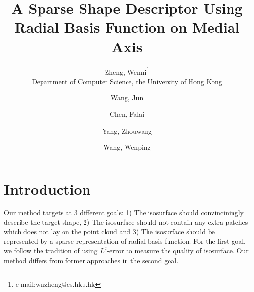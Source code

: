 \documentclass[review]{acmsiggraph}
\title{A Sparse Shape Descriptor Using Radial Basis Function on Medial Axis}
\author{Zheng, Wenni\thanks{e-mail:wnzheng@cs.hku.hk}\\Department of Computer Science, the University of Hong Kong}
\author{Wang, Jun}
\author{Chen, Falai}
\author{Yang, Zhouwang}
\author{Wang, Wenping}
\begin{document}

\maketitle

\begin{abstract}


\end{abstract}


\keywordlist


\copyrightspace

\section{Introduction}

Our method targets at 3 different goals: 1) The isosurface should convinciningly describe the target shape, 2) The isosurface should not contain any extra patches which does not lay on the point cloud and 3) The isosurface should be represented by a sparse representation of radial basis function. For the first goal, we follow the tradition of using $L^2$-error to measure the quality of isosurface. Our method differs from former approaches in the second goal.
\end{document}
